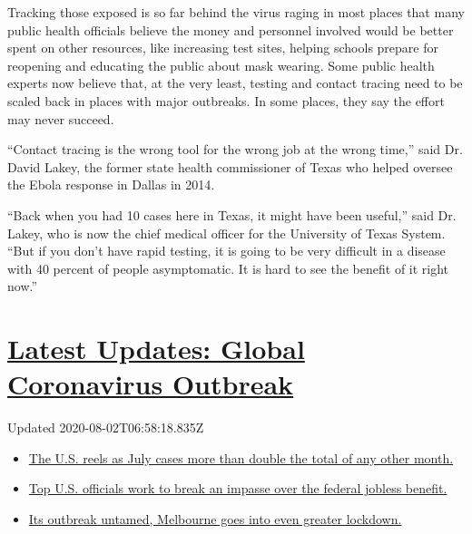Tracking those exposed is so far behind the virus raging in most places
that many public health officials believe the money and personnel
involved would be better spent on other resources, like increasing test
sites, helping schools prepare for reopening and educating the public
about mask wearing. Some public health experts now believe that, at the
very least, testing and contact tracing need to be scaled back in places
with major outbreaks. In some places, they say the effort may never
succeed.

``Contact tracing is the wrong tool for the wrong job at the wrong
time,'' said Dr. David Lakey, the former state health commissioner of
Texas who helped oversee the Ebola response in Dallas in 2014.

``Back when you had 10 cases here in Texas, it might have been useful,''
said Dr. Lakey, who is now the chief medical officer for the University
of Texas System. ``But if you don't have rapid testing, it is going to
be very difficult in a disease with 40 percent of people asymptomatic.
It is hard to see the benefit of it right now.''

\hypertarget{latest-updates-global-coronavirus-outbreak}{%
\section{\texorpdfstring{\href{https://www.nytimes.com/2020/08/01/world/coronavirus-covid-19.html?action=click\&pgtype=Article\&state=default\&region=MAIN_CONTENT_1\&context=storylines_live_updates}{Latest
Updates: Global Coronavirus
Outbreak}}{Latest Updates: Global Coronavirus Outbreak}}\label{latest-updates-global-coronavirus-outbreak}}

Updated 2020-08-02T06:58:18.835Z

\begin{itemize}
\tightlist
\item
  \href{https://www.nytimes.com/2020/08/01/world/coronavirus-covid-19.html?action=click\&pgtype=Article\&state=default\&region=MAIN_CONTENT_1\&context=storylines_live_updates\#link-34047410}{The
  U.S. reels as July cases more than double the total of any other
  month.}
\item
  \href{https://www.nytimes.com/2020/08/01/world/coronavirus-covid-19.html?action=click\&pgtype=Article\&state=default\&region=MAIN_CONTENT_1\&context=storylines_live_updates\#link-780ec966}{Top
  U.S. officials work to break an impasse over the federal jobless
  benefit.}
\item
  \href{https://www.nytimes.com/2020/08/01/world/coronavirus-covid-19.html?action=click\&pgtype=Article\&state=default\&region=MAIN_CONTENT_1\&context=storylines_live_updates\#link-2bc8948}{Its
  outbreak untamed, Melbourne goes into even greater lockdown.}
\end{itemize}

